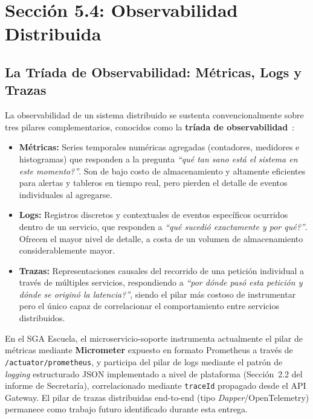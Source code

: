 ﻿\documentclass[11pt,a4paper]{article}
\begin{document}
\section{Secci\'on 5.4: Observabilidad Distribuida}
\label{sec:seccion54}

\subsection{La Tr\'iada de Observabilidad: M\'etricas, Logs y Trazas}
La observabilidad de un sistema distribuido se sustenta convencionalmente sobre tres pilares complementarios, conocidos como la \textbf{tr\'iada de observabilidad}~\cite{kleppmann2017designing,burns2025designing}:

\begin{itemize}[noitemsep]
  \item \textbf{M\'etricas:} Series temporales num\'ericas agregadas (contadores, medidores e histogramas) que responden a la pregunta \textit{``\textquestiondown qu\'e tan sano est\'a el sistema en este momento?''}. Son de bajo costo de almacenamiento y altamente eficientes para alertas y tableros en tiempo real, pero pierden el detalle de eventos individuales al agregarse.
  \item \textbf{Logs:} Registros discretos y contextuales de eventos espec\'ificos ocurridos dentro de un servicio, que responden a \textit{``\textquestiondown qu\'e sucedi\'o exactamente y por qu\'e?''}. Ofrecen el mayor nivel de detalle, a costa de un volumen de almacenamiento considerablemente mayor.
  \item \textbf{Trazas:} Representaciones causales del recorrido de una petici\'on individual a trav\'es de m\'ultiples servicios, respondiendo a \textit{``\textquestiondown por d\'onde pas\'o esta petici\'on y d\'onde se origin\'o la latencia?''}, siendo el pilar m\'as costoso de instrumentar pero el \'unico capaz de correlacionar el comportamiento entre servicios distribuidos.
\end{itemize}

\noindent En el SGA Escuela, el microservicio-soporte instrumenta actualmente el pilar de m\'etricas mediante \textbf{Micrometer} expuesto en formato Prometheus a trav\'es de \texttt{/actuator/prometheus}, y participa del pilar de logs mediante el patr\'on de \textit{logging} estructurado JSON implementado a nivel de plataforma (Secci\'on~2.2 del informe de Secretar\'ia), correlacionado mediante \texttt{traceId} propagado desde el API Gateway. El pilar de trazas distribuidas end-to-end (tipo \textit{Dapper}/OpenTelemetry) permanece como trabajo futuro identificado durante esta entrega.
\end{document}
